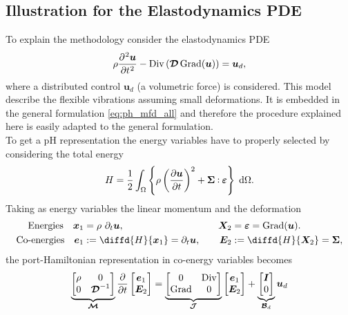 \documentclass{svjour3}                     %
\DeclareMathOperator*{\Grad}{Grad}
\DeclareMathOperator*{\Div}{Div}
\def\onedot{$\mathsurround0pt\ldotp$}
\def\cddot{%
	\mathbin{\vcenter{\baselineskip.67ex
			\hbox{\onedot}\hbox{\onedot}}%
}}
\begin{document}
\subsection{Illustration for the Elastodynamics PDE}
To explain the methodology consider the elastodynamics PDE
\begin{equation*}
\rho \diffp[2]{\bm{u}}{t} - \Div\left(\bm{\mathcal{D}} \Grad(\bm{u})\right) = \bm{u}_d,
\end{equation*}
where a distributed control $\bm{u}_d$ (a volumetric force) is considered. This model describe the flexible vibrations assuming small deformations. It is embedded in the general formulation \eqref{eq:ph_mfd_all} and therefore the procedure explained here is easily adapted to the general formulation. \\
To get a pH representation the energy variables have to properly selected by considering the total energy
\begin{equation}
	\label{eq:en_eldyn}
	\displaystyle H = \frac{1}{2} \int_{\Omega} \left\{\rho \left(\diffp{\bm{u}}{t}\right)^2 + \bm\Sigma \cddot \bm\varepsilon \right\} \d{\Omega}.
\end{equation}
Taking as energy variables the linear momentum and the deformation
\begin{equation}
\begin{aligned}
\text{Energies} \quad  \bm{x}_1 &= \rho \ \partial_t \bm{u}, \\
\text{Co-energies} \quad \bm{e}_1 &:= \diffd{H}{\bm{x}_1} =  \partial_t \bm{u}, \\
\end{aligned} \qquad
\begin{aligned}
\bm{X}_2 &= \bm\varepsilon = \Grad(\bm{u}). \\
\bm{E}_2 &:= \diffd{H}{\bm{X}_2} = \bm\Sigma,
\end{aligned}
\end{equation}
the port-Hamiltonian representation in co-energy variables becomes
\begin{equation*}
\underbrace{\begin{bmatrix}
\rho & 0 \\ 0 & \bm{\mathcal{D}}^{-1} \\
\end{bmatrix}}_{\bm{\mathcal{M}}}
\diffp{}{t}
\begin{bmatrix}
\bm{e}_1 \\ \bm{E}_2 \\
\end{bmatrix} = 
\underbrace{\begin{bmatrix}
0 & \Div \\ \Grad & 0 \\
\end{bmatrix}}_{\bm{\mathcal{J}}}
\begin{bmatrix}
\bm{e}_1 \\ \bm{E}_2 \\
\end{bmatrix} + 
\underbrace{\begin{bmatrix}
\bm{I} \\ 0 \\
\end{bmatrix}}_{\bm{\mathcal{B}}_d} \bm{u}_d 
\end{equation*}
\end{document}
